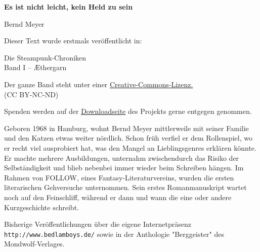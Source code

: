 \usepackage[ngerman]{babel}
\usepackage[T1]{fontenc}
\usepackage{textcomp}



\renewcommand*{\tb}{\begin{center}* \quad * \quad *\end{center}}

\newcommand\bigpar\medskip
\newcommand\gedanke\textit


\raggedbottom
\begin{center}
\textbf{\huge\textsf{Es ist nicht leicht, kein Held zu sein}}

\bigskip

Bernd Meyer
\end{center}

\bigskip

\begin{flushleft}
Dieser Text wurde erstmals veröffentlicht in:
\begin{center}
Die Steampunk-Chroniken\\
Band I -- Æthergarn
\end{center}

\bigskip

Der ganze Band steht unter einer
\href{http://creativecommons.org/licenses/by-nc-nd/2.0/de/}{Creative-Commons-Lizenz.} \\
(CC BY-NC-ND)

\bigskip

Spenden werden auf der
\href{http://steampunk-chroniken.de/download}{Downloadseite}
des Projekts gerne entgegen genommen.

\vfill

Geboren 1968 in Hamburg, wohnt Bernd Meyer mittlerweile mit seiner Familie
und den Katzen etwas weiter nördlich. Schon früh verfiel er dem
Rollenspiel, wo er recht viel ausprobiert hat, was den Mangel an
Lieblingsgenres erklären könnte. Er machte mehrere Ausbildungen,
unternahm zwischendurch das Risiko der Selbständigkeit und blieb
nebenbei immer wieder beim Schreiben hängen. Im Rahmen von FOLLOW,
eines Fantasy-Literaturvereins, wurden die ersten literarischen
Gehversuche unternommen. Sein erstes Romanmanuskript wartet noch
auf den Feinschliff, während er dann und wann die eine oder andere
Kurzgeschichte schreibt.

\bigpar

Bisherige Veröffentlichungen über die eigene Internetpräsenz
\texttt{http://www.bedlamboys.de/} sowie in
der Anthologie "Berggeister" des Mondwolf-Verlages.
\end{flushleft}

